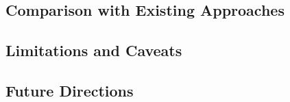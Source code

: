 \subsection{Comparison with Existing Approaches}

\subsection{Limitations and Caveats}

\subsection{Future Directions}
